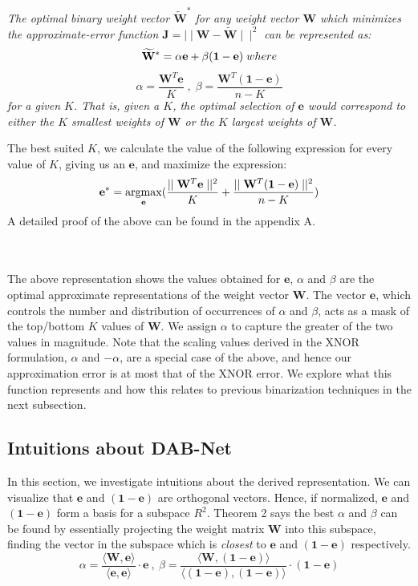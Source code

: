 \label{approx}
{\it The optimal binary weight vector $\widetilde{\mathbf{W}}^\ast$ for any weight vector $\mathbf{\mathbf{W}}$ which minimizes the approximate-error function $\mathbf{J} = \mid\mid \mathbf{W}-\widetilde{\mathbf{W}}\mid\mid^{2}$ can be represented as: %
$$\widetilde{\mathbf{W}}^\ast = \alpha \mathbf{e} + \beta \mathbf{(1-e)}  \; where\\$$
$$ \alpha =\frac{\mathbf{W}^{T}\mathbf{e}}{K} \;, \; \beta = \frac{\mathbf{W}^{T}\mathbf{(1-e)}}{n-K} $$ for a given $K$. That is, given a $K$, the optimal selection of $\mathbf{e}$ would correspond to either the $K$ smallest weights of $\mathbf{W}$ or the $K$ largest weights of $\mathbf{W}$. 

The best suited $K$, we calculate the value of the following expression for every value of $K$, giving us an $\mathbf{e}$, and maximize the expression: $$  \mathbf{e}^\ast  = \underset{\mathbf{e}}{\mathrm{argmax}}  (\frac{\mid\mid\mathbf{\mathbf{W}}^T\mathbf{e}\mid\mid^2}{K}+\frac{\mid\mid\mathbf{W}^T\mathbf{(1-e)}\mid\mid^2}{n-K}) \\$$
A detailed proof of the above can be found in the appendix A.}
\\\\
\noindent The above representation shows the values obtained for $\mathbf{e}$, $\alpha$ and $\beta$ are the optimal approximate representations of the weight vector $\mathbf{W}$. The vector $\mathbf{e}$, which controls the number and distribution of occurrences of $\alpha$ and $\beta$, acts as a mask of the top/bottom $K$ values of $\mathbf{W}$. We assign $\alpha$ to capture the greater of the two values in magnitude. Note that the scaling values derived in the XNOR formulation, $\alpha$ and $-\alpha$, are a special case of the above, and hence our approximation error is at most that of the  XNOR error. We explore what  this function represents and how this relates to previous binarization techniques in the next subsection.

\subsection{Intuitions about DAB-Net}

\noindent In this section, we investigate intuitions about the derived representation. We can visualize that $\mathbf{e}$ and $\mathbf{(1-e)}$ are orthogonal vectors. Hence, if normalized, $\mathbf{e}$ and $\mathbf{(1-e)}$ form a basis for a subspace $R^{2}$. Theorem 2 says the best $\alpha$ and $\beta$ can be found by essentially projecting the weight matrix $\mathbf{W}$ into this subspace, finding the vector in the subspace which is \textit{closest} to $\mathbf{e}$ and $\mathbf{(1-e)}$ respectively. $$\alpha = \frac{\langle \mathbf{W}, \mathbf{e} \rangle}{\langle \mathbf{e} , \mathbf{e} \rangle} \cdot \mathbf{e} \ , \  \beta = \frac{\langle \mathbf{W}, \mathbf{(1-e)} \rangle}{\langle \mathbf{(1-e)} , \mathbf{(1-e)} \rangle} \cdot \mathbf{(1-e)}$$ 

